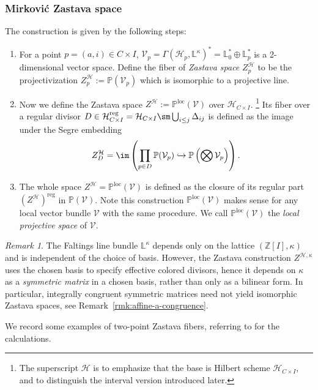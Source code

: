\documentclass{amsart}
\numberwithin{equation}{section}
\numberwithin{figure}{section}
\theoremstyle{definition}
\theoremstyle{remark}
\newtheorem{rmk}[thm]{Remark}
\renewcommand{\c}[1]{\mathcal{#1}}
\renewcommand{\b}[1]{\mathbb{#1}}
\begin{document}
\subsubsection{Mirkovi\'c Zastava space}
The construction is given by the following steps:
\begin{enumerate}
	\item
	For a point $p=(a,i)\in C\times I$,
	$\c{V}_p=\Gamma(\c H_p,\b{L}^\kappa)^*=\b{L}_0^*\oplus \b{L}_p^*$ is a 2-dimensional vector space. Define the fiber of \textit{Zastava space} $Z^{\c H}_p$ to be the projectivization $Z^{\c H}_p:=\b{P}(\c{V}_p)$ which is isomorphic to a projective line.
	
	\item	
	Now we define the Zastava space 
	 $Z^{\c H}:=\b{P}^{\text{loc}}(\c{V})$ over $\c{H}_{C\times I}$. 
	 \footnote{The superscript $\c H$ is to emphasize that the base is Hilbert scheme $\c H_{C\times I}$, and to distinguish the interval version introduced later.} 
	 Its fiber over a regular divisor $D\in \c{H}_{C\times I}^{\text{reg}}=\c{H}_{C\times I}\sm \bigcup_{i\le j}\Delta_{ij}$ is defined as the image under the Segre embedding $$Z^{\c H}_D=\im\left( \prod_{p\in D}\b{P}(\c{V}_p)\hookrightarrow\b{P}\left( \bigotimes \c{V}_p\right) \right) .$$ 
	\item 
	The whole space $Z^{\c H}=\b{P}^{\text{loc}}(\c V)$ is defined as the closure of its regular part $(Z^{\c H})^{\text{reg}}$ in $\b{P}(\c{V})$. Note this construction $\b{P}^{\text{loc}}(\c{V})$ makes sense for any local vector bundle $\c{V}$ with the same procedure. We call  $\b{P}^{\text{loc}}(\c{V})$ the \textit{local projective space} of $\c{V}$.
\end{enumerate}
\begin{rmk}
	The Faltings line bundle $\b L^\kappa$ depends only on the
	lattice $(\b Z[I],\kappa)$ and is independent of the choice of basis.
	However, the Zastava construction $Z^{\c H,\kappa}$ uses the chosen basis to
	specify effective colored divisors, hence it depends on
	$\kappa$ as a \textit{symmetric matrix} in a chosen basis, rather than only as a bilinear form. In particular, integrally congruent
	symmetric matrices need not yield isomorphic Zastava spaces,
	see Remark~\ref{rmk:affine-a-congruence}.
\end{rmk}
We record some examples of two-point Zastava fibers, referring to
\cite{mirkovicnoteszastava} for the calculations.
\end{document}
